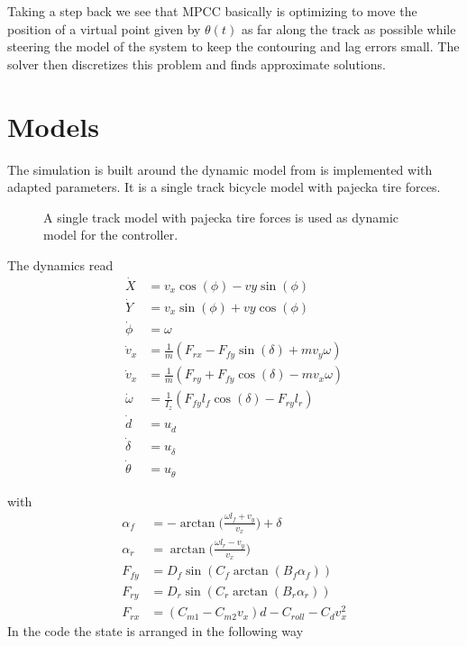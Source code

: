 \documentclass[12pt]{article}
\begin{document}
Taking a step back we see that MPCC basically is optimizing to move the position of a virtual point given by $\theta(t)$ as far along the track as possible while steering the model of the system to keep the contouring and lag errors small. The solver then discretizes this problem and finds approximate solutions.
\section{Models}

The simulation is built around the dynamic model from \cite{liniger2015optimization} is implemented with adapted parameters. It is a single track bicycle model with pajecka tire forces. 
\begin{figure}[h!]
	\vspace{-1 cm}
	\centering
	
	\caption{A single track model with pajecka tire forces is used as dynamic model for the controller.}
\end{figure}

The dynamics read 
\begin{align}
\dot{X} &= v_x\cos(\phi)-vy\sin(\phi)\\
\dot{Y} &= v_x\sin(\phi)+vy\cos(\phi)\\
\dot{\phi} &= \omega\\
\dot{v}_x &= \frac{1}{m}(F_{rx}-F_{fy}\sin(\delta)+mv_y\omega) \\
\dot{v}_x &= \frac{1}{m}(F_{ry}+F_{fy}\cos(\delta)-mv_x\omega) \\
\dot{\omega} &= \frac{1}{I_z}(F_{fy}l_f\cos(\delta)-F_{ry}l_r)\\
\dot{d} &= u_{\dot{d}}\\
\dot{\delta} &= u_{\dot{\delta}}\\
\dot{\theta} &= u_{\dot{ \theta}}
\end{align}

with
\begin{align}
\alpha_f &= -\arctan\Big(\frac{\omega l_f+v_y}{v_x}\Big)+\delta\\
\alpha_r &= \arctan\Big(\frac{\omega l_r-v_y}{v_x}\Big)\\
F_{fy} &= D_f\sin(C_f\arctan(B_f\alpha_f))\\	
F_{ry} &= D_r\sin(C_r\arctan(B_r\alpha_r))\\
F_{rx} &= (C_{m1}- C_{m2}v_x)d-C_{roll}-C_dv_x^2
\end{align}
In the code the state is arranged in the following way
\end{document}
